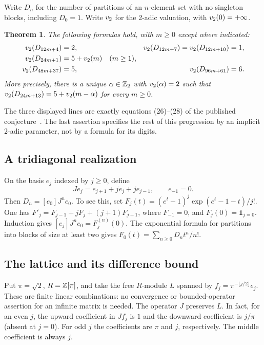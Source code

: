 \documentclass[11pt,a4paper]{article}
\newtheorem{SourceRcdKtheorem}{Theorem}
\begin{document}
Write $D_n$ for the number of partitions of an $n$-element set with no
singleton blocks, including $D_0=1$. Write $v_2$ for the 2-adic valuation,
with $v_2(0)=+\infty$.
\begin{SourceRcdKtheorem}\label{R23K:thm}
The following formulas hold, with $m\ge0$ except where indicated:
\begin{align*}
 v_2(D_{12m+4})&=2, &
 v_2(D_{12m+7})=v_2(D_{12m+10})&=1,\\
 v_2(D_{24m+1})&=5+v_2(m) \quad(m\ge1),\\
 v_2(D_{48m+37})&=5, &
 v_2(D_{96m+61})&=6.
\end{align*}
More precisely, there is a unique $\alpha\in\mathbb Z_2$ with
$v_2(\alpha)=2$ such that
$v_2(D_{24m+13})=5+v_2(m-\alpha)$ for every $m\ge0$.
\end{SourceRcdKtheorem}
The three displayed lines are exactly equations (26)--(28) of the
published conjecture~\cite{R23K:MRV}. The last assertion specifies the rest of
this progression by an implicit 2-adic parameter, not by a formula for
its digits.

\subsection*{A tridiagonal realization}
On the basis $e_j$ indexed by $j\ge0$, define
\[
 J e_j=e_{j+1}+j e_j+j e_{j-1},\qquad e_{-1}=0.
\]
Then $D_n=[e_0]J^n e_0$. To see this, set
$F_j(t)=(e^t-1)^j\exp(e^t-1-t)/j!$.
One has $F'_j=F_{j-1}+jF_j+(j+1)F_{j+1}$, where $F_{-1}=0$,
and $F_j(0)=\mathbf1_{j=0}$. Induction gives
$[e_j]J^n e_0=F_j^{(n)}(0)$.
The exponential formula for partitions into blocks of size at least two
gives $F_0(t)=\sum_{n\ge0}D_n t^n/n!$.


\subsection*{The lattice and its difference bound}
Put $\pi=\sqrt2$, $R=\mathbb Z[\pi]$, and take the free $R$-module
$L$ spanned by $f_j=\pi^{-\lfloor j/2\rfloor} e_j$. These are
finite linear combinations: no convergence or bounded-operator
assertion for an infinite matrix is needed. The operator $J$
preserves $L$. In fact, for an even $j$, the upward coefficient in
$J f_j$ is $1$ and the downward coefficient is $j/\pi$
(absent at $j=0$). For odd $j$ the coefficients are $\pi$ and $j$,
respectively. The middle coefficient is always $j$.
\end{document}
